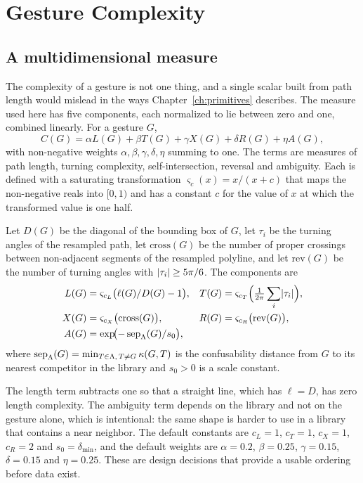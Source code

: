 \chapter{Gesture Complexity}\label{ch:complexity}

\section{A multidimensional measure}

The complexity of a gesture is not one thing, and a single scalar built from path length would mislead in the ways Chapter~\ref{ch:primitives} describes. The measure used here has five components, each normalized to lie between zero and one, combined linearly. For a gesture $G$,
\[
C(G)=\alpha L(G)+\beta T(G)+\gamma X(G)+\delta R(G)+\eta A(G),
\]
with non-negative weights $\alpha,\beta,\gamma,\delta,\eta$ summing to one. The terms are measures of path length, turning complexity, self-intersection, reversal and ambiguity. Each is defined with a saturating transformation $\varsigma_c(x)=x/(x+c)$ that maps the non-negative reals into $[0,1)$ and has a constant $c$ for the value of $x$ at which the transformed value is one half.

\begin{definition}[Components]\label{def:components}
Let $D(G)$ be the diagonal of the bounding box of $G$, let $\tau_i$ be the turning angles of the resampled path, let $\mathrm{cross}(G)$ be the number of proper crossings between non-adjacent segments of the resampled polyline, and let $\mathrm{rev}(G)$ be the number of turning angles with $\lvert \tau_i\rvert\ge5\pi/6$. The components are
\begin{align*}
L(G)&=\varsigma_{c_L}\bigl(\ell(G)/D(G)-1\bigr), &
T(G)&=\varsigma_{c_T}\Bigl(\tfrac{1}{2\pi}\sum_i\lvert \tau_i\rvert\Bigr),\\
X(G)&=\varsigma_{c_X}\bigl(\mathrm{cross}(G)\bigr), &
R(G)&=\varsigma_{c_R}\bigl(\mathrm{rev}(G)\bigr),\\
A(G)&=\exp\!\bigl(-\operatorname{sep}_{\Lambda}(G)/s_0\bigr),
\end{align*}
where $\operatorname{sep}_{\Lambda}(G)=\min_{T\in\Lambda,\,T\ne G}\kappa(G,T)$ is the confusability distance from $G$ to its nearest competitor in the library and $s_0>0$ is a scale constant.
\end{definition}

The length term subtracts one so that a straight line, which has $\ell=D$, has zero length complexity. The ambiguity term depends on the library and not on the gesture alone, which is intentional: the same shape is harder to use in a library that contains a near neighbor. The default constants are $c_L=1$, $c_T=1$, $c_X=1$, $c_R=2$ and $s_0=\delta_{\min}$, and the default weights are $\alpha=0.2$, $\beta=0.25$, $\gamma=0.15$, $\delta=0.15$ and $\eta=0.25$. These are design decisions that provide a usable ordering before data exist.\evS

